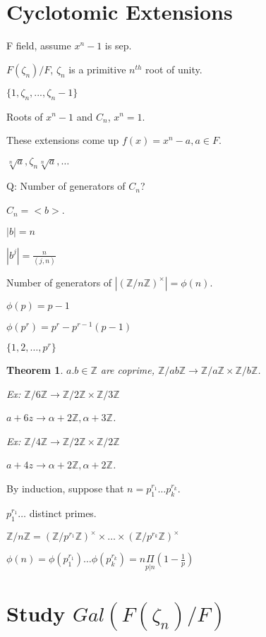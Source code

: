 \documentclass[twoside]{article}
\newcounter{lecnum}
\newcommand{\Z}{\mathbb{Z}}
\newcommand{\zn}{\zeta_n}
\newtheorem{theorem}{Theorem}[lecnum]
\begin{document}
    \section{Cyclotomic Extensions}

    F field, assume $x^n - 1$ is sep. 

    $F(\zeta_n)/F$, $\zeta_n$ is a primitive $n^{th}$ root of unity. 


    $\{1,\zn, ..., \zn - 1 \}$

    Roots of $x^n - 1$ and $C_n$, $x^n = 1$. 

    These extensions come up $f(x) = x^n - a, a \in F$.

    $\sqrt[n] a, \zn \sqrt[n]{a}, \dots$

    Q: Number of generators of $C_n$?

    $C_n = <b>$.

    $|b| = n$

    $|b^j| = \frac{n}{(j,n)}$
  
    Number of generators of $|(\Z/n\Z)^\times| = \phi(n)$.

    $\phi(p) = p - 1$

    $\phi(p^r) = p^r - p^{r-1}(p-1)$

    $\{1,2, \dots, p^r\}$

    \begin{theorem}
        $a.b \in \Z$ are coprime, $\Z/ab\Z \rightarrow \Z/a\Z \times \Z/b\Z$. 

        Ex: $\Z/6\Z \rightarrow \Z/2\Z \times \Z/3\Z$

        $a + 6z \rightarrow \alpha + 2\Z, \alpha + 3\Z$.

        Ex: $\Z/4\Z \rightarrow \Z/2\Z \times \Z/2\Z$

        $a + 4z \rightarrow \alpha + 2\Z, \alpha + 2\Z$.
    \end{theorem}

    By induction, suppose that $n = p_1^{r_1}\dots p_k^{r_k}$.

    $p_1^{r_1}\dots$ distinct primes. 

    $\Z/n\Z = (\Z/p^{r_1}\Z)^{\times} \times \dots \times (\Z/p^{r_k}\Z)^{\times}$

    $\phi(n) = \phi(p_1^{r_1})\dots\phi(p_k^{r_k}) = n\underset{p \vert n}\Pi(1 - \frac1p)$


    \section{Study $Gal(F(\zn)/F)$}
\end{document}

